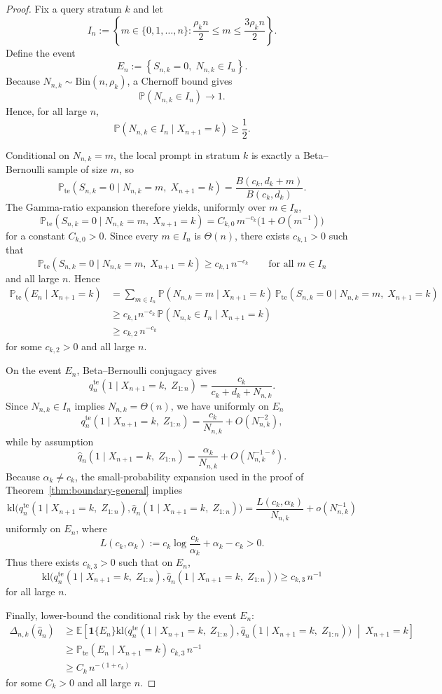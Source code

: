 \documentclass{article}
\theoremstyle{definition}
\theoremstyle{remark}
\newcommand{\E}{\mathbb{E}}
\newcommand{\Pbb}{\mathbb{P}}
\newcommand{\Bin}{\mathrm{Bin}}
\newcommand{\ind}{\mathbf{1}}
\newcommand{\te}{\mathrm{te}}
\newcommand{\klb}{\mathrm{kl}}
\begin{document}
\begin{proof}
Fix a query stratum $k$ and let
\[
I_n
:=
\left\{
m\in\{0,1,\dots,n\}
:
\frac{\rho_k n}{2}\le m\le \frac{3\rho_k n}{2}
\right\}.
\]
Define the event
\[
E_n
:=
\left\{
S_{n,k}=0,\;
N_{n,k}\in I_n
\right\}.
\]
Because $N_{n,k}\sim \Bin(n,\rho_k)$, a Chernoff bound gives
\[
\Pbb(N_{n,k}\in I_n)\to 1.
\]
Hence, for all large $n$,
\[
\Pbb(N_{n,k}\in I_n\mid X_{n+1}=k)\ge \frac{1}{2}.
\]

Conditional on $N_{n,k}=m$, the local prompt in stratum $k$ is exactly a Beta--Bernoulli sample of size $m$, so
\[
\Pbb_{\te}(S_{n,k}=0\mid N_{n,k}=m,\;X_{n+1}=k)
=
\frac{B(c_k,d_k+m)}{B(c_k,d_k)}.
\]
The Gamma-ratio expansion therefore yields, uniformly over $m\in I_n$,
\[
\Pbb_{\te}(S_{n,k}=0\mid N_{n,k}=m,\;X_{n+1}=k)
=
C_{k,0}\,m^{-c_k}\bigl(1+O(m^{-1})\bigr)
\]
for a constant $C_{k,0}>0$. Since every $m\in I_n$ is $\Theta(n)$, there exists $c_{k,1}>0$ such that
\[
\Pbb_{\te}(S_{n,k}=0\mid N_{n,k}=m,\;X_{n+1}=k)
\ge
c_{k,1}\,n^{-c_k}
\qquad
\text{for all } m\in I_n
\]
and all large $n$. Hence
\begin{align*}
\Pbb_{\te}(E_n\mid X_{n+1}=k)
&=
\sum_{m\in I_n}
\Pbb(N_{n,k}=m\mid X_{n+1}=k)\,
\Pbb_{\te}(S_{n,k}=0\mid N_{n,k}=m,\;X_{n+1}=k) \\
&\ge
c_{k,1}n^{-c_k}\,
\Pbb(N_{n,k}\in I_n\mid X_{n+1}=k) \\
&\ge
c_{k,2}\,n^{-c_k}
\end{align*}
for some $c_{k,2}>0$ and all large $n$.

On the event $E_n$, Beta--Bernoulli conjugacy gives
\[
q_n^{\te}(1\mid X_{n+1}=k,\;Z_{1:n})
=
\frac{c_k}{c_k+d_k+N_{n,k}}.
\]
Since $N_{n,k}\in I_n$ implies $N_{n,k}=\Theta(n)$, we have uniformly on $E_n$
\[
q_n^{\te}(1\mid X_{n+1}=k,\;Z_{1:n})
=
\frac{c_k}{N_{n,k}}+O(N_{n,k}^{-2}),
\]
while by assumption
\[
\hat q_n(1\mid X_{n+1}=k,\;Z_{1:n})
=
\frac{\alpha_k}{N_{n,k}}+O(N_{n,k}^{-1-\delta}).
\]
Because $\alpha_k\neq c_k$, the small-probability expansion used in the proof of Theorem~\ref{thm:boundary-general} implies
\[
\klb\bigl(
q_n^{\te}(1\mid X_{n+1}=k,\;Z_{1:n}),
\hat q_n(1\mid X_{n+1}=k,\;Z_{1:n})
\bigr)
=
\frac{L(c_k,\alpha_k)}{N_{n,k}}+o(N_{n,k}^{-1})
\]
uniformly on $E_n$, where
\[
L(c_k,\alpha_k)
:=
c_k\log\frac{c_k}{\alpha_k}+\alpha_k-c_k
>
0.
\]
Thus there exists $c_{k,3}>0$ such that on $E_n$,
\[
\klb\bigl(
q_n^{\te}(1\mid X_{n+1}=k,\;Z_{1:n}),
\hat q_n(1\mid X_{n+1}=k,\;Z_{1:n})
\bigr)
\ge
c_{k,3}\,n^{-1}
\]
for all large $n$.

Finally, lower-bound the conditional risk by the event $E_n$:
\begin{align*}
\Delta_{n,k}(\hat q_n)
&\ge
\E\!\left[
\ind\{E_n\}
\klb\bigl(
q_n^{\te}(1\mid X_{n+1}=k,\;Z_{1:n}),
\hat q_n(1\mid X_{n+1}=k,\;Z_{1:n})
\bigr)
\;\middle|\;
X_{n+1}=k
\right] \\
&\ge
\Pbb_{\te}(E_n\mid X_{n+1}=k)\,c_{k,3}\,n^{-1} \\
&\ge
C_k\,n^{-(1+c_k)}
\end{align*}
for some $C_k>0$ and all large $n$.
\end{proof}
\end{document}
